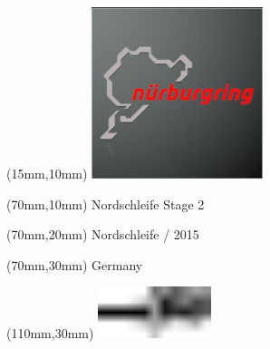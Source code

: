 \null\newpage
\begin{textblock*}{50mm}(15mm,10mm)%
\includegraphics[width=50mm]{LG/2015-05-20_00088.png}
\end{textblock*}
\begin{textblock*}{130mm}(70mm,10mm)%
{\fontsize{20}{20}\selectfont Nordschleife Stage 2}\\
\end{textblock*}
\begin{textblock*}{120mm}(70mm,20mm)%
{\fontsize{16}{16}\selectfont Nordschleife / 2015}\\
\end{textblock*}
\begin{textblock*}{120mm}(70mm,30mm)%
{\fontsize{12}{12}\selectfont Germany}
\end{textblock*}
\begin{textblock*}{30mm}(110mm,30mm)%
\centering
\includegraphics[height=15mm]{icons/tofinish.pdf}
\end{textblock*}
